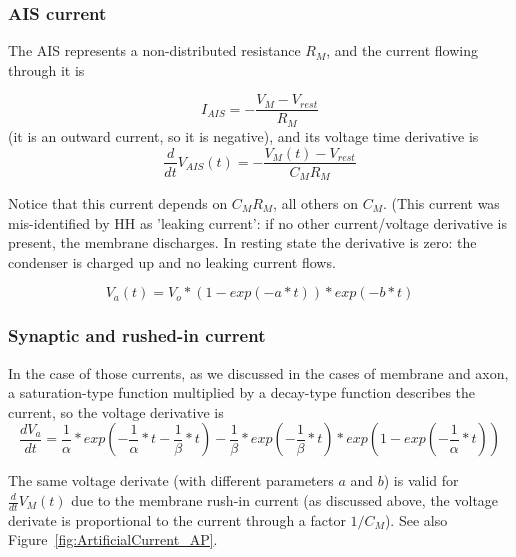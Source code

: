 \subsubsection{AIS current\label{sec:Physiology-NeuralCurrents_AIS}}
The \gls{AIS}  represents a non-distributed resistance $R_M$, and the current
flowing through it is

\begin{equation}
	I_{AIS} =  - \frac{V_M-V_{rest}}{R_M} \label{eq:I_AIS}
\end{equation}
(it is an outward current, so it is negative),
and its voltage time derivative is
\begin{equation}
	\frac{d}{dt} V_{AIS}(t) = - \frac{V_M(t)-V_{rest}}{C_M R_M}  \label{eq:dVdt_AIS}
	\end{equation}

Notice that this current depends on $C_M R_M$, all others on $C_M$.
(This current was mis-identified by HH as 'leaking current':
if no other current/voltage derivative is present, the membrane discharges. In resting state the derivative is zero: 
the condenser is charged up and no leaking current flows.



\begin{equation}
	V_{a}(t)=V_{o}*(1-exp(-a*t))*exp(-b*t)\label{eq:PSPVoltage}
\end{equation}


\subsubsection{Synaptic and rushed-in current\label{sec:Physiology-NeuralCurrents_PSP}}
In the case of those currents, as we discussed in the cases of
membrane
and axon,  a saturation-type function
multiplied by a decay-type function describes the current, so the voltage derivative is
%
\begin{equation}
	\frac{dV_{a}}{dt}=\frac{1}{\alpha}*exp(-\frac{1}{\alpha}*t-\frac{1}{\beta}*t)-\frac{1}{\beta}*exp(-\frac{1}{\beta}*t)*exp(1-exp(-\frac{1}{\alpha}*t))\label{eq:PSPderivative}
\end{equation}

The same voltage derivate (with different parameters $a$ and  $b$) is valid
for $\frac{d}{dt}V_{M}(t)$ due to the membrane rush-in current (as discussed above, the voltage derivate is proportional
to the current through a factor $1/C_{M}$). See also Figure~\ref{fig:ArtificialCurrent_AP}.




